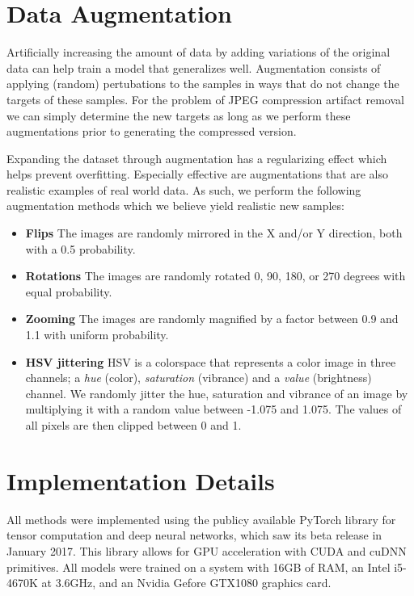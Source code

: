\section{Data Augmentation}
Artificially increasing the amount of data by adding variations of the original data can help train a model that generalizes well. Augmentation consists of applying (random) pertubations to the samples in ways that do not change the targets of these samples. For the problem of JPEG compression artifact removal we can simply determine the new targets as long as we perform these augmentations prior to generating the compressed version. 

Expanding the dataset through augmentation has a regularizing effect which helps prevent overfitting. Especially effective are augmentations that are also realistic examples of real world data. As such, we perform the following augmentation methods which we believe yield realistic new samples:

\begin{itemize}

\item \textbf{Flips}
The images are randomly mirrored in the X and/or Y direction, both with a 0.5 probability. 

\item \textbf{Rotations}
The images are randomly rotated 0, 90, 180, or 270 degrees with equal probability.

\item \textbf{Zooming}
The images are randomly magnified by a factor between 0.9 and 1.1 with uniform probability.

\item \textbf{HSV jittering}
HSV is a colorspace that represents a color image in three channels; a \emph{hue} (color), \emph{saturation} (vibrance) and a \emph{value} (brightness) channel. We randomly jitter the hue, saturation and vibrance of an image by multiplying it with a random value between -1.075 and 1.075. The values of all pixels are then clipped between 0 and 1.

\end{itemize}


\section{Implementation Details}
All methods were implemented using the publicy available PyTorch library for tensor computation and deep neural networks, which saw its beta release in January 2017. This library allows for GPU acceleration with CUDA and cuDNN primitives. All models were trained on a system with 16GB of RAM, an Intel i5-4670K at 3.6GHz, and an Nvidia Gefore GTX1080 graphics card. 

